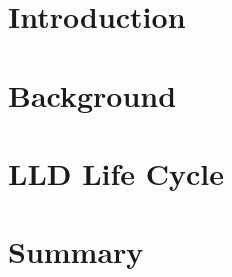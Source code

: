 \documentclass[11pt]{article}
\begin{document}


\section{Introduction}\label{sec:intro}


\section{Background}


\section{LLD Life Cycle}


% 

\section{Summary}




\end{document}
